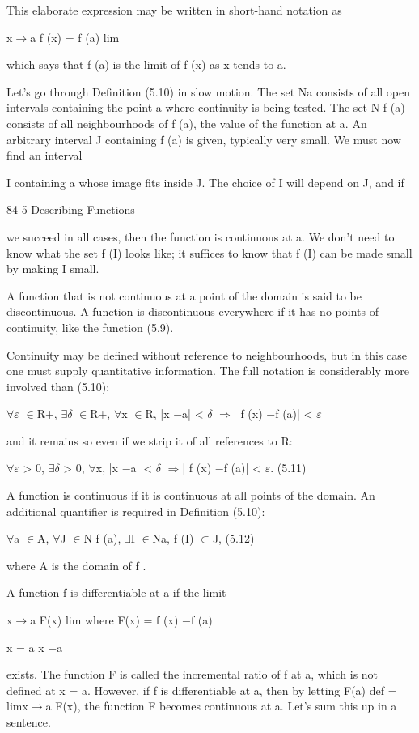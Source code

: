 \documentclass[11pt]{article}
\theoremstyle{plain}
\theoremstyle{definition}
\begin{document}
This elaborate expression may be written in short-hand notation as

x$\to$a f (x) = f (a) lim

which says that f (a) is the limit of f (x) as x tends to a.

Let's go through Definition (5.10) in slow motion. The set Na consists of all open intervals containing the point a where continuity is being tested. The set N f (a) consists of all neighbourhoods of f (a), the value of the function at a. An arbitrary interval J containing f (a) is given, typically very small. We must now find an interval

I containing a whose image fits inside J. The choice of I will depend on J, and if

84 5 Describing Functions

we succeed in all cases, then the function is continuous at a. We don't need to know what the set f (I) looks like; it suffices to know that f (I) can be made small by making I small.

A function that is not continuous at a point of the domain is said to be discontinuous. A function is discontinuous everywhere if it has no points of continuity, like the function (5.9).

Continuity may be defined without reference to neighbourhoods, but in this case one must supply quantitative information. The full notation is considerably more involved than (5.10):

$\forall$$\varepsilon$ $\in$R+, $\exists$$\delta$ $\in$R+, $\forall$x $\in$R, |x $-$a| < $\delta$ $\Rightarrow$| f (x) $-$f (a)| < $\varepsilon$

and it remains so even if we strip it of all references to R:

$\forall$$\varepsilon$ > 0, $\exists$$\delta$ > 0, $\forall$x, |x $-$a| < $\delta$ $\Rightarrow$| f (x) $-$f (a)| < $\varepsilon$. (5.11)

A function is continuous if it is continuous at all points of the domain. An additional quantifier is required in Definition (5.10):

$\forall$a $\in$A, $\forall$J $\in$N f (a), $\exists$I $\in$Na, f (I) $\subset$J, (5.12)

where A is the domain of f .

A function f is differentiable at a if the limit

x$\to$a F(x) lim where F(x) = f (x) $-$f (a)

x = a x $-$a

exists. The function F is called the incremental ratio of f at a, which is not defined at x = a. However, if f is differentiable at a, then by letting F(a) def = limx$\to$a F(x), the function F becomes continuous at a. Let's sum this up in a sentence.
\end{document}
